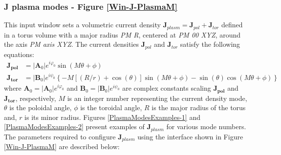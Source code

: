\subsubsection{J plasma modes - Figure \ref{Win-J-PlasmaM}}

This input window sets a volumetric current density $\textbf{J}_{plasm} = \textbf{J}_{pol} + \textbf{J}_{tor}$ defined in a torus volume with a major radius \emph{PM R}, centered at \emph{PM 00 XYZ}, around the axis \emph{PM axis XYZ}. The current densities $\textbf{J}_{pol}$ and $\textbf{J}_{tor}$ satisfy the following equations:
\begin{equation}\label{PlasmaModeJ}
	\begin{aligned}
		\mathbf{J_{pol}} &= \left|\mathbf{A}_{0}\right|e^{i\varphi_{0}}\sin\left(M\theta+\phi\right)
		\\
		\mathbf{J_{tor}} &= \left|\mathbf{B}_{0}\right|e^{i\psi_{0}}\left\lbrace-M\left[\left(R/r\right) + \cos\left(\theta\right)\right]\sin\left(M\theta+\phi\right) - \sin(\theta)\cos\left( M\theta+\phi\right)\right\rbrace 
	\end{aligned}
\end{equation}
where $\mathbf{A}_{0} = \left|\mathbf{A}_{0}\right|e^{i\varphi_{0}}$ and $\mathbf{B}_{0} = \left|\mathbf{B}_{0}\right|e^{i\psi_{0}}$ are complex constants scaling $\mathbf{J_{pol}}$ and $\mathbf{J_{tor}}$, respectively, $M$ is an integer number representing the current density mode, $\theta$ is the poloidal angle, $\phi$ is the toroidal angle, $R$ is the major radius of the torus and, $r$ is its minor radius. Figures \ref{PlasmaModesExamples-1} and \ref{PlasmaModesExamples-2} present examples of $\textbf{J}_{plasm}$ for various mode numbers. The parameters required to configure $\textbf{J}_{plasm}$ using the interface shown in Figure \ref{Win-J-PlasmaM} are described below:
\quad\\
